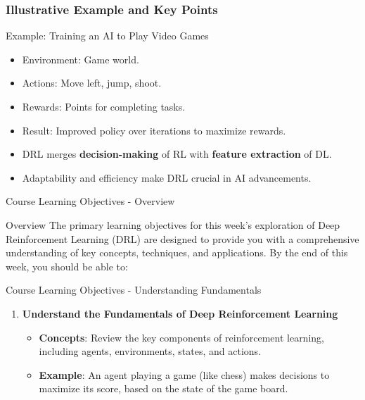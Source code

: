 \documentclass[aspectratio=169]{beamer}
\begin{document}
\begin{frame}[fragile]
    \frametitle{Illustrative Example and Key Points}
    \begin{block}{Example: Training an AI to Play Video Games}
        \begin{itemize}
            \item Environment: Game world.
            \item Actions: Move left, jump, shoot.
            \item Rewards: Points for completing tasks.
            \item Result: Improved policy over iterations to maximize rewards.
        \end{itemize}
    \end{block}
    
    \begin{itemize}
        \item DRL merges \textbf{decision-making} of RL with \textbf{feature extraction} of DL.
        \item Adaptability and efficiency make DRL crucial in AI advancements.
    \end{itemize}
\end{frame}

\begin{frame}[fragile]{Course Learning Objectives - Overview}
    \begin{block}{Overview}
        The primary learning objectives for this week's exploration of Deep Reinforcement Learning (DRL) are designed to provide you with a comprehensive understanding of key concepts, techniques, and applications. By the end of this week, you should be able to:
    \end{block}
\end{frame}

\begin{frame}[fragile]{Course Learning Objectives - Understanding Fundamentals}
    \begin{enumerate}
        \item \textbf{Understand the Fundamentals of Deep Reinforcement Learning}
            \begin{itemize}
                \item \textbf{Concepts}: Review the key components of reinforcement learning, including agents, environments, states, and actions.
                \item \textbf{Example}: An agent playing a game (like chess) makes decisions to maximize its score, based on the state of the game board.
            \end{itemize}
    \end{enumerate}
\end{frame}
\end{document}
